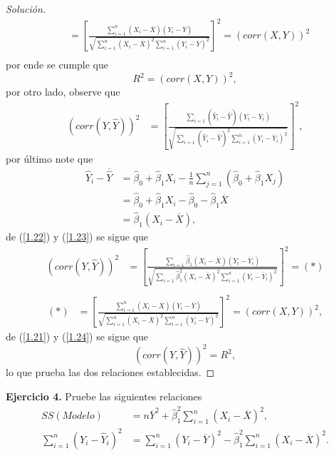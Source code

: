 \documentclass[10.5pt,notitlepage]{article}
\newenvironment{solucion}
  {\begin{proof}[Solución]}
  {\end{proof}}
\newcommand{\corch}[1]{\left[ #1 \right]}
\newcommand{\pare}[1]{\left( #1 \right)}
\begin{document}
\begin{solucion}
\begin{align}
        &= \corch{\frac{\sum_{i = 1}^{n}(X_i - \overline{X})(Y_i - \overline{Y})}{\sqrt{\sum_{i = 1}^{n}(X_i - \overline{X})^2\sum_{i=1}^{n}(Y_i - \overline{Y})^2}}}^{2} = \pare{corr(X,Y)}^2\nonumber\\  
\end{align}
por ende se cumple que 
\begin{equation}\label{1.21}
   R^2 = \pare{corr(X,Y)}^2, 
\end{equation}
por otro lado, observe que 
\begin{align}
    (corr(Y,\hat{Y}))^2 &= \corch{\frac{\sum_{i=1}(\hat{Y}_i - \overline{\hat{Y}})(Y_i - \overline{Y}_i)}{\sqrt{\sum_{i=1}(\hat{Y}_i - \overline{\hat{Y}})^2 \sum_{i=1}^{n}(Y_i - \overline{Y}_i)^2}}}^2, \label{1.22}
\end{align}
por último note que
\begin{align}
    \hat{Y}_i - \overline{\hat{Y}} &= \hat{\beta}_0 + \hat{\beta}_1 X_i - \frac{1}{n}\sum_{j = 1}^{n}(\hat{\beta}_0 + \hat{\beta}_1 X_j)\nonumber\\ 
                                     &=  \hat{\beta}_0 + \hat{\beta}_1 X_i - \hat{\beta}_0 - \hat{\beta}_1 \overline{X}\nonumber\\ 
                                     &= \hat{\beta}_1 (X_i - \overline{X}), \label{1.23}
\end{align}
de (\ref{1.22}) y (\ref{1.23}) se sigue que 
\begin{align}
   (corr(Y,\hat{Y}))^2 &= \corch{\frac{\sum_{i=1}\hat{\beta}_1(X_i - \overline{X})(Y_i - \overline{Y}_i)}{\sqrt{\sum_{i=1}\hat{\beta}_{1}^2(X_i - \overline{X})^2 \sum_{i=1}^{n}(Y_i - \overline{Y}_i)^2}}}^2=(*)\nonumber\\ 
\end{align}
\begin{align}
    (*)&=\corch{\frac{\sum_{i = 1}^{n}(X_i - \overline{X})(Y_i - \overline{Y})}{\sqrt{\sum_{i = 1}^{n}(X_i - \overline{X})^2\sum_{i=1}^{n}(Y_i - \overline{Y})^2}}}^{2} = \pare{corr(X,Y)}^2, \label{1.24}
\end{align}
de (\ref{1.21}) y (\ref{1.24}) se sigue que
\[
   (corr(Y,\hat{Y}))^2 =  R^2,
\]
lo que prueba las dos relaciones establecidas. 
\end{solucion}
\noindent \textbf{Ejercicio 4.} Pruebe las siguientes relaciones 
\begin{align}
    SS(Modelo)&=n\overline{Y}^2 + \hat{\beta}_{1}^2\sum_{i = 1}^{n}(X_i - \overline{X})^2,\label{4.-1}\\ 
    \sum_{i=1}^{n}(Y_i - \hat{Y}_i)^2&= \sum_{i = 1}^{n}(Y_i - \overline{Y})^2 -  \hat{\beta}_{1}^2\sum_{i = 1}^{n}(X_i - \overline{X})^2.\label{4.0}
\end{align}
\end{document}
